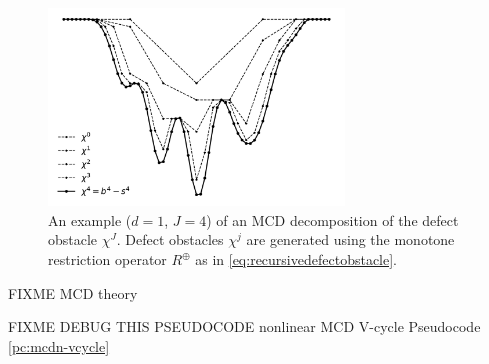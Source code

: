 \documentclass[letterpaper,final,12pt,reqno]{amsart}
\theoremstyle{claim}
\newcommand{\mR}{R^{\bm{\oplus}}}
\numberwithin{equation}{section}
\numberwithin{figure}{section}
\numberwithin{table}{section}
\numberwithin{theorem}{section}
\begin{document}
\begin{figure}[t]
\begin{center}
\includegraphics[width=0.7\textwidth]{fixfigs/decompclassical.pdf}
\end{center}
\caption{An example ($d=1$, $J=4$) of an MCD decomposition of the defect obstacle $\chi^J$.  Defect obstacles $\chi^j$ are generated using the monotone restriction operator $\mR$ as in \eqref{eq:recursivedefectobstacle}.}
\label{fig:decompclassical}
\end{figure}

FIXME MCD theory

FIXME DEBUG THIS PSEUDOCODE nonlinear MCD V-cycle Pseudocode \ref{pc:mcdn-vcycle}
\end{document}
